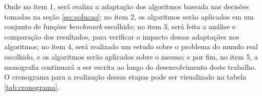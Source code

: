 Onde no item 1, será realiza a adaptação dos algoritmos baseada nas decisões tomadas na seção \ref{sec:solucao}; no item 2, os algoritmos serão aplicados em um conjunto de funções \textit{benchmark} escolhido; no item 3, será feita a análise e comparação dos resultados, para verificar o impacto dessas adaptações nos algoritmos; no item 4, será realizado um estudo sobre o problema do mundo real escolhido, e os algoritmos serão aplicados sobre o mesmo; e por fim, no item 5, a monografia continuará a ser escrita ao longo do desenvolvimento deste trabalho. O cronograma para a realização dessas etapas pode ser visualizado na tabela \ref{tab:cronograma}.
